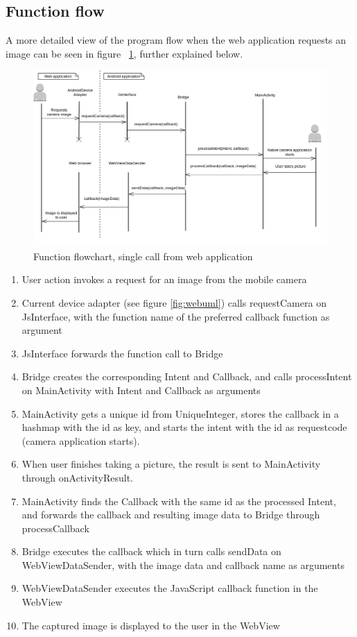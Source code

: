 \subsection{Function flow} \label{subsec:function-flow-native}
A more detailed view of the program flow when the web application requests an image can be seen in figure ~\ref{fig:nativeflow}, further explained below.
\begin{figure}[h!]
	\centering
    \includegraphics[width=150mm,natwidth=1000,natheight=750]{./img/androidfunctionflow.png}
    \caption{Function flowchart, single call from web application}
    \label{fig:nativeflow}
\end{figure}
\begin{enumerate}
	\item User action invokes a request for an image from the mobile camera
	\item Current device adapter (see figure \ref{fig:webuml}) calls requestCamera on JsInterface, with the function name of the preferred callback function as argument
	\item JsInterface forwards the function call to Bridge
	\item Bridge creates the corresponding Intent and Callback, and calls processIntent on MainActivity with Intent and Callback as arguments
	\item MainActivity gets a unique id from UniqueInteger, stores the callback in a hashmap with the id as key, and starts the intent with the id as requestcode (camera application starts).
	\item When user finishes taking a picture, the result is sent to MainActivity through onActivityResult.
	\item MainActivity finds the Callback with the same id as the processed Intent, and forwards the callback and resulting image data to Bridge through processCallback
	\item Bridge executes the callback which in turn calls sendData on WebViewDataSender, with the image data and callback name as arguments
	\item WebViewDataSender executes the JavaScript callback function in the WebView
	\item The captured image is displayed to the user in the WebView
\end{enumerate}

